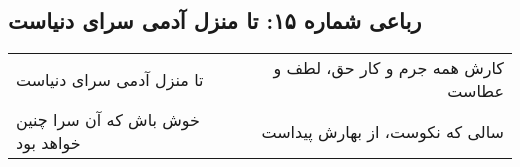 \begin{center}
\section*{رباعی شماره ۱۵: تا منزل آدمی سرای دنیاست}
\label{sec:015}
\begin{longtable}{l p{0.5cm} r}
تا منزل آدمی سرای دنیاست
&&
کارش همه جرم و کار حق، لطف و عطاست
\\
خوش باش که آن سرا چنین خواهد بود
&&
سالی که نکوست، از بهارش پیداست
\\
\end{longtable}
\end{center}
